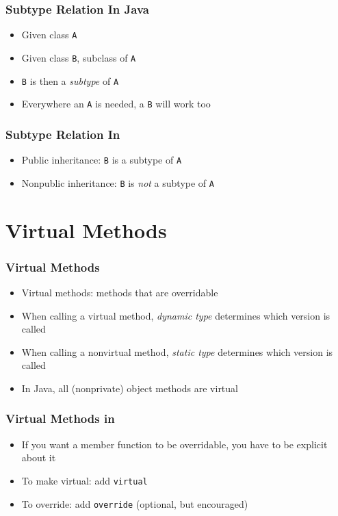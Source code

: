 \begin{frame}
  \frametitle{Subtype Relation In Java}
  \begin{itemize}
    \item Given class {\tt A}
    \item Given class {\tt B}, subclass of {\tt A}
    \item {\tt B} is then a \emph{subtype} of {\tt A}
    \item Everywhere an {\tt A} is needed, a {\tt B} will work too
  \end{itemize}
\end{frame}

\begin{frame}
  \frametitle{Subtype Relation In \cpp}
  \begin{itemize}
    \item Public inheritance: {\tt B} is a subtype of {\tt A}
    \item Nonpublic inheritance: {\tt B} is \emph{not} a subtype of {\tt A}
  \end{itemize}
\end{frame}

\section{Virtual Methods}

\begin{frame}
  \tableofcontents[currentsection]
\end{frame}

\begin{frame}
  \frametitle{Virtual Methods}
  \begin{itemize}
    \item Virtual methods: methods that are overridable
    \item When calling a virtual method, \emph{dynamic type} determines which version is called
    \item When calling a nonvirtual method, \emph{static type} determines which version is called
    \item In Java, all (nonprivate) object methods are virtual
  \end{itemize}
\end{frame}

\begin{frame}
  \frametitle{Virtual Methods in \cpp}
  \begin{itemize}
    \item If you want a member function to be overridable, you have to be explicit about it
    \item To make virtual: add {\tt virtual}
    \item To override: add {\tt override} (optional, but encouraged)
  \end{itemize}
  \vskip5mm
\end{frame}


